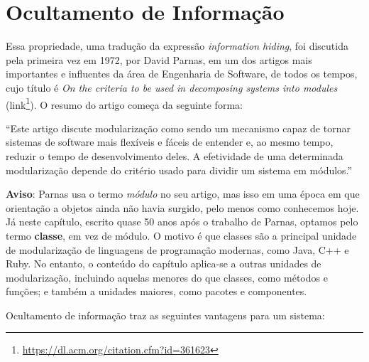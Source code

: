 \documentclass[
  11pt,
  twoside]{book}
\DeclareRobustCommand{\href}[2]{#2\footnote{\url{#1}}}
\renewenvironment{quote}{\centering \vspace{1.5ex} \begin{tcolorbox}[colback=backcolor, width=4.9in]}{\end{tcolorbox}}
\begin{document}
\hypertarget{ocultamento-de-informauxe7uxe3o}{%
\section{Ocultamento de
Informação}\label{ocultamento-de-informauxe7uxe3o}}

 
 Essa propriedade, uma tradução da expressão
\emph{information hiding}, foi discutida pela primeira vez em 1972, por
David Parnas, em um dos artigos mais importantes e influentes da área de
Engenharia de Software, de todos os tempos, cujo título é \emph{On the
criteria to be used in decomposing systems into modules}
(\href{https://dl.acm.org/citation.cfm?id=361623}{link}). O resumo do
artigo começa da seguinte forma:

\begin{quote}
``Este artigo discute modularização como sendo um mecanismo capaz de
tornar sistemas de software mais flexíveis e fáceis de entender e, ao
mesmo tempo, reduzir o tempo de desenvolvimento deles. A efetividade de
uma determinada modularização depende do critério usado para dividir um
sistema em módulos.''
\end{quote}

 \textbf{Aviso}: Parnas usa o termo \emph{módulo} no seu
artigo, mas isso em uma época em que orientação a objetos ainda não
havia surgido, pelo menos como conhecemos hoje. Já neste capítulo,
escrito quase 50 anos após o trabalho de Parnas, optamos pelo termo
\textbf{classe}, em vez de módulo. O motivo é que classes são a
principal unidade de modularização de linguagens de programação
modernas, como Java, C++ e Ruby. No entanto, o conteúdo do capítulo
aplica-se a outras unidades de modularização, incluindo aquelas menores
do que classes, como métodos e funções; e também a unidades maiores,
como pacotes e componentes.

Ocultamento de informação traz as seguintes vantagens para um sistema:
\end{document}
